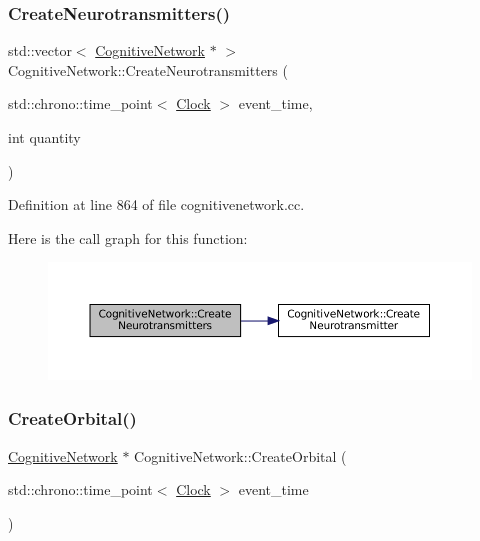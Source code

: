 \subsubsection{\texorpdfstring{Create\+Neurotransmitters()}{CreateNeurotransmitters()}}
{\footnotesize\ttfamily std\+::vector$<$ \mbox{\hyperlink{class_cognitive_network}{Cognitive\+Network}} $\ast$ $>$ Cognitive\+Network\+::\+Create\+Neurotransmitters (\begin{DoxyParamCaption}\item[{std\+::chrono\+::time\+\_\+point$<$ \mbox{\hyperlink{universe_8h_a0ef8d951d1ca5ab3cfaf7ab4c7a6fd80}{Clock}} $>$}]{event\+\_\+time,  }\item[{int}]{quantity }\end{DoxyParamCaption})}



Definition at line 864 of file cognitivenetwork.\+cc.

Here is the call graph for this function\+:\nopagebreak
\begin{figure}[H]
\begin{center}
\leavevmode
\includegraphics[width=350pt]{class_cognitive_network_ad877c495c9efdb582613a5af8d854ac3_cgraph}
\end{center}
\end{figure}
\mbox{\label{class_cognitive_network_a5e0a782afc45d75d57fef91dd5513546}} 
\subsubsection{\texorpdfstring{Create\+Orbital()}{CreateOrbital()}}
{\footnotesize\ttfamily \mbox{\hyperlink{class_cognitive_network}{Cognitive\+Network}} $\ast$ Cognitive\+Network\+::\+Create\+Orbital (\begin{DoxyParamCaption}\item[{std\+::chrono\+::time\+\_\+point$<$ \mbox{\hyperlink{universe_8h_a0ef8d951d1ca5ab3cfaf7ab4c7a6fd80}{Clock}} $>$}]{event\+\_\+time }\end{DoxyParamCaption})}



